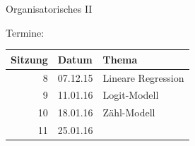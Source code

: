 \documentclass[ignorenonframetext,]{beamer}
\begin{document}
\begin{frame}{Organisatorisches II}

Termine:

\begin{longtable}[c]{@{}rll@{}}
\toprule
\begin{minipage}[b]{0.17\columnwidth}\raggedleft\strut
Sitzung
\strut\end{minipage} &
\begin{minipage}[b]{0.17\columnwidth}\raggedright\strut
Datum
\strut\end{minipage} &
\begin{minipage}[b]{0.58\columnwidth}\raggedright\strut
Thema
\strut\end{minipage}\tabularnewline
\midrule
\endhead
\begin{minipage}[t]{0.17\columnwidth}\raggedleft\strut
8
\strut\end{minipage} &
\begin{minipage}[t]{0.17\columnwidth}\raggedright\strut
07.12.15
\strut\end{minipage} &
\begin{minipage}[t]{0.58\columnwidth}\raggedright\strut
Lineare Regression
\strut\end{minipage}\tabularnewline
\begin{minipage}[t]{0.17\columnwidth}\raggedleft\strut
9
\strut\end{minipage} &
\begin{minipage}[t]{0.17\columnwidth}\raggedright\strut
11.01.16
\strut\end{minipage} &
\begin{minipage}[t]{0.58\columnwidth}\raggedright\strut
Logit-Modell
\strut\end{minipage}\tabularnewline
\begin{minipage}[t]{0.17\columnwidth}\raggedleft\strut
10
\strut\end{minipage} &
\begin{minipage}[t]{0.17\columnwidth}\raggedright\strut
18.01.16
\strut\end{minipage} &
\begin{minipage}[t]{0.58\columnwidth}\raggedright\strut
Zähl-Modell
\strut\end{minipage}\tabularnewline
\begin{minipage}[t]{0.17\columnwidth}\raggedleft\strut
11
\strut\end{minipage} &
\begin{minipage}[t]{0.17\columnwidth}\raggedright\strut
25.01.16
\strut\end{minipage} &

\end{longtable}
\end{frame}
\end{document}
